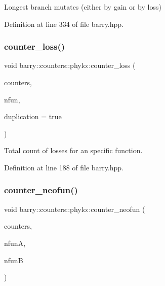 Longest branch mutates (either by gain or by loss) 



Definition at line 334 of file barry.\+hpp.

\mbox{\label{namespacebarry_1_1counters_1_1phylo_affbd49d13928ece0a2f100261375d2a7}} 
\subsubsection{\texorpdfstring{counter\+\_\+loss()}{counter\_loss()}}
{\footnotesize\ttfamily void barry\+::counters\+::phylo\+::counter\+\_\+loss (\begin{DoxyParamCaption}\item[{\hyperlink{namespacebarry_1_1counters_1_1phylo_a4e401ffe66d04091343dcffaf915f8c3}{Phylo\+Counters} $\ast$}]{counters,  }\item[{std\+::vector$<$ \hyperlink{namespacebarry_a11dfc53ddb4672278319aa04f1e09a6c}{uint} $>$}]{nfun,  }\item[{bool}]{duplication = {\ttfamily true} }\end{DoxyParamCaption})\hspace{0.3cm}{\ttfamily [inline]}}



Total count of losses for an specific function. 



Definition at line 188 of file barry.\+hpp.

\mbox{\label{namespacebarry_1_1counters_1_1phylo_a54cb8c96750fcde91b0e7c95b54f5fc5}} 
\subsubsection{\texorpdfstring{counter\+\_\+neofun()}{counter\_neofun()}}
{\footnotesize\ttfamily void barry\+::counters\+::phylo\+::counter\+\_\+neofun (\begin{DoxyParamCaption}\item[{\hyperlink{namespacebarry_1_1counters_1_1phylo_a4e401ffe66d04091343dcffaf915f8c3}{Phylo\+Counters} $\ast$}]{counters,  }\item[{\hyperlink{namespacebarry_a11dfc53ddb4672278319aa04f1e09a6c}{uint}}]{nfunA,  }\item[{\hyperlink{namespacebarry_a11dfc53ddb4672278319aa04f1e09a6c}{uint}}]{nfunB }\end{DoxyParamCaption})\hspace{0.3cm}{\ttfamily [inline]}}



